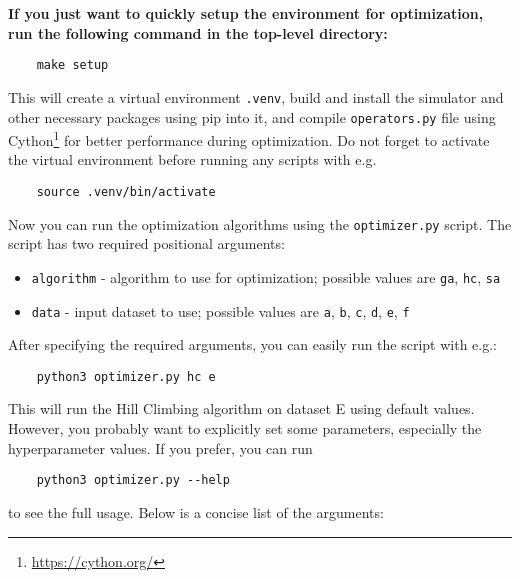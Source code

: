 \textbf{If you just want to quickly setup the environment for optimization, run the following command in the top-level directory:}
\begin{verbatim}
    make setup
\end{verbatim}
This will create a virtual environment \verb|.venv|, build and install the simulator and other necessary packages using pip into it, and compile \verb|operators.py| file using Cython\footnote{\url{https://cython.org/}} for better performance during optimization. Do not forget to activate the virtual environment before running any scripts with e.g.
\begin{verbatim}
    source .venv/bin/activate
\end{verbatim}
Now you can run the optimization algorithms using the \verb|optimizer.py| script. The script has two required positional arguments:
\begin{itemize}
    \item \verb|algorithm| - algorithm to use for optimization; possible values are \verb|ga|, \verb|hc|, \verb|sa|
    \item \verb|data| - input dataset to use; possible values are \verb|a|, \verb|b|, \verb|c|, \verb|d|, \verb|e|, \verb|f|
\end{itemize}
After specifying the required arguments, you can easily run the script with e.g.:
\begin{verbatim}
    python3 optimizer.py hc e
\end{verbatim}
This will run the Hill Climbing algorithm on dataset E using default values. However, you probably want to explicitly set some parameters, especially the hyperparameter values. If you prefer, you can run
\begin{verbatim}
    python3 optimizer.py --help
\end{verbatim}
to see the full usage. Below is a concise list of the arguments:

